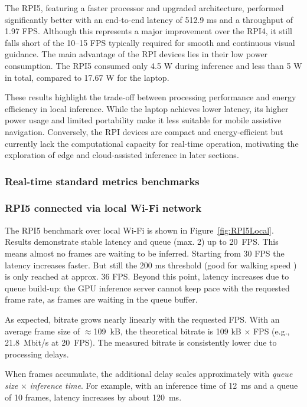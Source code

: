 \documentclass{ieeeaccess}
\begin{document}
The RPI5, featuring a faster processor and upgraded architecture, performed significantly better with an end-to-end latency of 512.9 ms and a throughput of 1.97 FPS.
Although this represents a major improvement over the RPI4, it still falls short of the 10–15 FPS typically required for smooth and continuous visual guidance.
The main advantage of the RPI devices lies in their low power consumption. The RPI5 consumed only 4.5 W during inference and less than 5 W in total, compared to 17.67 W for the laptop.

These results highlight the trade-off between processing performance and energy efficiency in local inference.
While the laptop achieves lower latency, its higher power usage and limited portability make it less suitable for mobile assistive navigation.
Conversely, the RPI devices are compact and energy-efficient but currently lack the computational capacity for real-time operation, motivating the exploration of edge and cloud-assisted inference in later sections.


\subsubsection{Real-time standard metrics benchmarks}
\label{sec:realtimeResponsiveness}

\subsubsection*{RPI5 connected via local Wi-Fi network}
\label{sec:RPILocalBenchmark}
The RPI5 benchmark over local Wi-Fi is shown in Figure~\ref{fig:RPI5Local}. Results demonstrate stable latency and queue (max. 2) up to 20~FPS. This means almost no frames are waiting to be inferred. Starting from 30 FPS the latency increases faster. But still the 200 ms threshold (good for walking speed \cite{gao2019edge}) is only reached at approx. 36 FPS. Beyond this point, latency increases due to queue build-up: the GPU inference server cannot keep pace with the requested frame rate, as frames are waiting in the queue buffer. %

As expected, bitrate grows nearly linearly with the requested FPS. With an average frame size of $\approx$109~kB, the theoretical bitrate is 109 kB $\times$ FPS (e.g., 21.8~Mbit/s at 20~FPS). The measured bitrate is consistently lower due to processing delays.

When frames accumulate, the additional delay scales approximately with \textit{queue size} $\times$ \textit{inference time}. For example, with an inference time of 12~ms and a queue of 10 frames, latency increases by about 120~ms.
\end{document}
